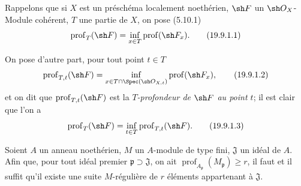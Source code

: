 
\begin{env}[19.9.1]
Rappelons que si $X$ est un préschéma localement noethérien, $\sh F$ un $\sh O_X$-Module cohérent, $T$ une partie de $X$, on pose (5.10.1)
\begin{equation}
  \operatorname{prof}_T(\sh F)=\inf_{x\in T}\operatorname{prof}(\sh F_x).
  \tag{19.9.1.1}\label{IV.19.9.1.1}
\end{equation}

On pose d'autre part, pour tout point $t\in T$
\begin{equation}
  \operatorname{prof}_{T,t}(\sh F)=\inf_{x\in T\cap\Spec(\sh O_{X,t})}\operatorname{prof}(\sh F_x),
  \tag{19.9.1.2}\label{IV.19.9.1.2}
\end{equation}
et on dit que $\operatorname{prof}_{T,t}(\sh F)$ est la \emph{$T$-profondeur de $\sh F$ au point $t$}; il est clair que l'on a
\begin{equation}
  \operatorname{prof}_T(\sh F)=\inf_{t\in T}\operatorname{prof}_{T,t}(\sh F).
  \tag{19.9.1.3}\label{IV.19.9.1.3}
\end{equation}
\end{env}

\begin{lemma}[19.9.2]
\label{IV.19.9.2}
Soient $A$ un anneau noethérien, $M$ un $A$-module de type fini, $\mathfrak J$ un idéal de $A$. Afin que, pour tout idéal premier $\mathfrak p\supset\mathfrak J$, on ait $\operatorname{prof}_{A_{\mathfrak p}}(M_{\mathfrak p})\geq r$, il faut et il suffit qu'il existe une suite $M$-régulière de $r$ éléments appartenant à $\mathfrak J$.
\end{lemma}

